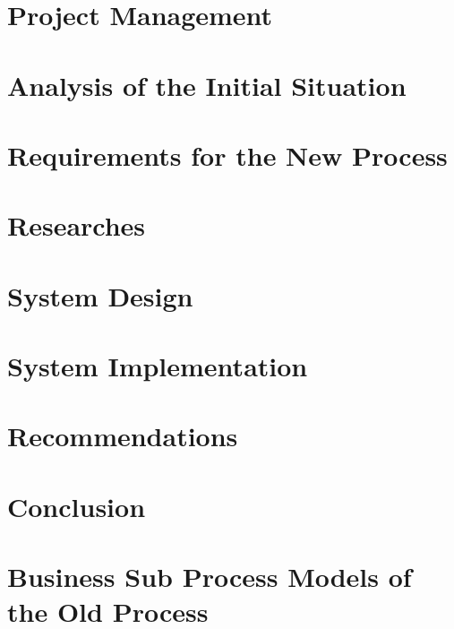 	\chapter{Project Management}
	\label{ch:management}
	
	
	\chapter{Analysis of the Initial Situation}
	\label{ch:analysis}
	
	
	\chapter{Requirements for the New Process}
	\label{ch:requirements}
	
	
	\chapter{Researches}
	\label{ch:research}
	
	
	\chapter{System Design}
	\label{ch:design}
	
	
	\chapter{System Implementation}
	\label{ch:implementation}
	
	
	\chapter{Recommendations}
	\label{ch:advice}
	
	
	\chapter{Conclusion}
	\label{ch:conclusion}
	
	
	\printbibliography
	
	\clearpage
	\appendix
	
	
	\chapter{Business Sub Process Models of the Old Process}
	\label{bpmnOld}
	
	
